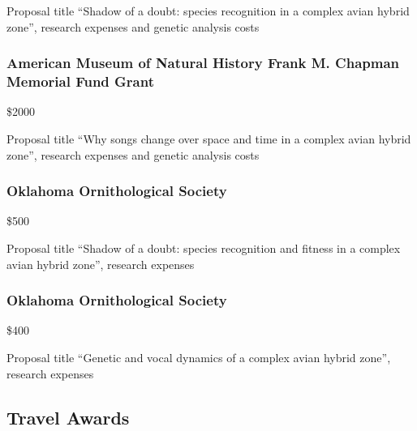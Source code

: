 \documentclass[
  letterpaper,
  DIV=11,
  numbers=noendperiod,
  oneside]{scrreprt}
\begin{document}
Proposal title ``Shadow of a doubt: species recognition in a complex
avian hybrid zone'', research expenses and genetic analysis costs

\subsubsection{American Museum of Natural History Frank M. Chapman
Memorial Fund
Grant}\label{american-museum-of-natural-history-frank-m.-chapman-memorial-fund-grant-1}

\$2000


Proposal title ``Why songs change over space and time in a complex avian
hybrid zone'', research expenses and genetic analysis costs

\subsubsection{Oklahoma Ornithological
Society}\label{oklahoma-ornithological-society}

\$500


Proposal title ``Shadow of a doubt: species recognition and fitness in a
complex avian hybrid zone'', research expenses

\subsubsection{Oklahoma Ornithological
Society}\label{oklahoma-ornithological-society-1}

\$400


Proposal title ``Genetic and vocal dynamics of a complex avian hybrid
zone'', research expenses

\subsection{Travel Awards}\label{travel-awards-1}
\end{document}
